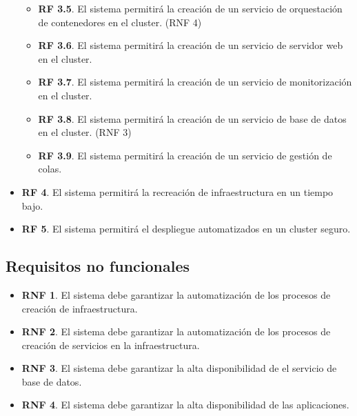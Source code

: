 \begin{itemize}
\begin{itemize}
			\item \textbf{RF 3.5}. El sistema permitirá la creación de un servicio de orquestación de contenedores en el cluster. (RNF 4)
			\item \textbf{RF 3.6}. El sistema permitirá la creación de un servicio de servidor web en el cluster.
			\item \textbf{RF 3.7}. El sistema permitirá la creación de un servicio de monitorización en el cluster.
			\item \textbf{RF 3.8}. El sistema permitirá la creación de un servicio de base de datos en el cluster. (RNF 3)
			\item \textbf{RF 3.9}. El sistema permitirá la creación de un servicio de gestión de colas.
		\end{itemize}
	
	\item \textbf{RF 4}. El sistema permitirá la recreación de infraestructura en un tiempo bajo. \label{RF4}
	
	\item \textbf{RF 5}. El sistema permitirá el despliegue automatizados en un cluster seguro. \label{RF5}
	\end{itemize}

	\subsection{Requisitos no funcionales}
	\begin{itemize}
		\item \textbf{RNF 1}. El sistema debe garantizar la automatización de los procesos de creación de infraestructura.
		\item \textbf{RNF 2}. El sistema debe garantizar la automatización de los procesos de creación de servicios en la infraestructura.
		\item \textbf{RNF 3}. El sistema debe garantizar la alta disponibilidad de el servicio de base de datos.
		\item \textbf{RNF 4}. El sistema debe garantizar la alta disponibilidad de las aplicaciones.
	\end{itemize}

